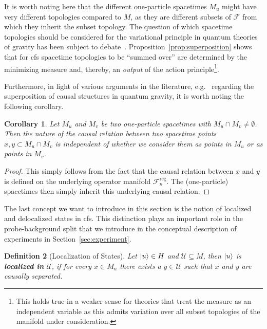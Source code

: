 \documentclass[reqno,11pt]{amsart}
\newcommand{\Freg}{\F_n^{\text{reg}}}
\newcommand{\F}{{\mathcal{F}}}
\newtheorem{definition}{Definition}[section]
\newtheorem{corollary}[definition]{Corollary}
\numberwithin{equation}{section}
\begin{document}
It is worth noting here that the different one-particle spacetimes $M_u$ might have very different topologies compared to $M$,
as they are different subsets of $\F$ from which they inherit the subset topology.
The question of which spacetime topologies should be considered for the variational principle in quantum theories of gravity has been
subject to debate~\cite{carlip1993sum,loll2006nonperturbative,glaser2019quantum,buoninfante2024visions}.
Proposition~\ref{prop:superposition} shows that for \ac{cfs} spacetime topologies to be ``summed over'' are determined by
the minimizing measure and, thereby, an \textit{output} of the action principle\footnote{
This holds true in a weaker sense for theories that treat the measure as an independent variable as this admits variation over all subset topologies of the manifold under consideration.
}.

Furthermore, in light of various arguments in the literature, e.g.~\cite{jiatimeorder, hartle1995spacetime,lightconefluctuations,ford1999spacetime,hardy2005probability,hardy2007towards,zych2019bell,zychquantumtemporal,zychblackhole,foo2021schrodinger,foo2023quantum,foo2023relativity}
regarding the superposition of causal structures in quantum gravity, it is worth noting the following corollary.

\begin{corollary}\label{cor:fixcausalstructure}
    Let $M_u$ and $M_v$ be two one-particle spacetimes with $M_u \cap M_v \neq \emptyset$.
    Then the nature of the causal relation between two spacetime points $x, y \subset M_u \cap M_v$ is independent of whether we consider them as points in $M_u$ or as points in $M_v$.
\end{corollary}
\begin{proof}
    This simply follows from the fact that the causal relation between $x$ and $y$ is defined on the underlying operator manifold $\Freg$.
    The (one-particle) spacetimes then simply inherit this underlying causal relation.
\end{proof}

The last concept we want to introduce in this section is the notion of localized and delocalized states in \ac{cfs}.
This distinction plays an important role in the probe-background split that we introduce in the conceptual description
of experiments in Section~\ref{sec:experiment}.

\begin{definition}[Localization of States]\label{def:localization-of-states}
    Let $\ket{u} \in H$ and $\mathcal{U} \subseteq M$, then $\ket{u}$ is \textbf{localized in} $\mathcal{U}$, if
    for every $x \in M_u$ there exists a $y \in \mathcal{U}$ such that $x$ and $y$ are causally separated.
\end{definition}
\end{document}
